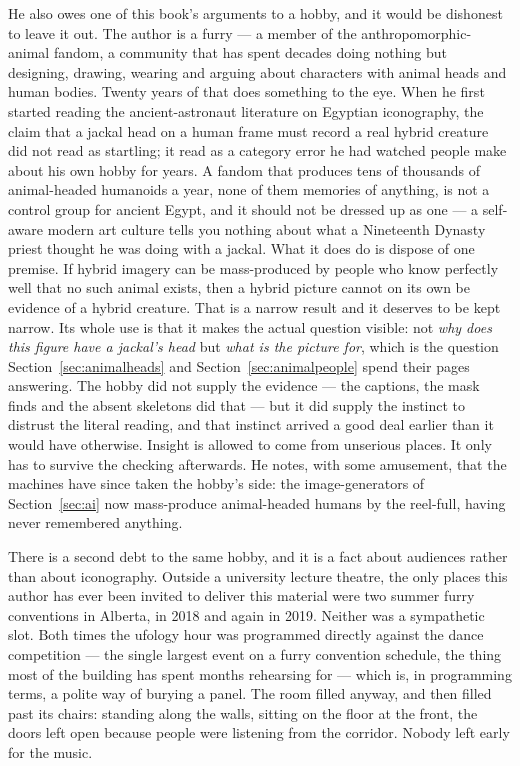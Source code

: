 He also owes one of this book's arguments to a hobby, and it would be dishonest to leave it out.
The author is a furry --- a member of the anthropomorphic-animal fandom, a community that has spent
decades doing nothing but designing, drawing, wearing and arguing about characters with animal heads
and human bodies. Twenty years of that does something to the eye. When he first started reading the
ancient-astronaut literature on Egyptian iconography, the claim that a jackal head on a human frame
must record a real hybrid creature did not read as startling; it read as a category error he had
watched people make about his own hobby for years. A fandom that produces tens of thousands of
animal-headed humanoids a year, none of them memories of anything, is not a control group for
ancient Egypt, and it should not be dressed up as one --- a self-aware modern art culture tells you
nothing about what a Nineteenth Dynasty priest thought he was doing with a jackal. What it does do
is dispose of one premise. If hybrid imagery can be mass-produced by people who know perfectly well
that no such animal exists, then a hybrid picture cannot on its own be evidence of a hybrid
creature. That is a narrow result and it deserves to be kept narrow. Its whole use is that it makes
the actual question visible: not \emph{why does this figure have a jackal's head} but \emph{what is
the picture for}, which is the question Section~\ref{sec:animalheads} and
Section~\ref{sec:animalpeople} spend their pages answering. The hobby did not supply the evidence
--- the captions, the mask finds and the absent skeletons did that --- but it did supply the
instinct to distrust the literal reading, and that instinct arrived a good deal earlier than it
would have otherwise. Insight is allowed to come from unserious places. It only has to survive the
checking afterwards. He notes, with some amusement, that the machines have since taken the hobby's
side: the image-generators of Section~\ref{sec:ai} now mass-produce animal-headed humans by the
reel-full, having never remembered anything.

\vspace{4pt}\par
\noindent There is a second debt to the same hobby, and it is a fact about audiences rather than
about iconography. Outside a university lecture theatre, the only places this author has ever been
invited to deliver this material were two summer furry conventions in Alberta, in 2018 and again in
2019. Neither was a sympathetic slot. Both times the ufology hour was programmed directly against
the dance competition --- the single largest event on a furry convention schedule, the thing most of
the building has spent months rehearsing for --- which is, in programming terms, a polite way of
burying a panel. The room filled anyway, and then filled past its chairs: standing along the walls,
sitting on the floor at the front, the doors left open because people were listening from the
corridor. Nobody left early for the music.

